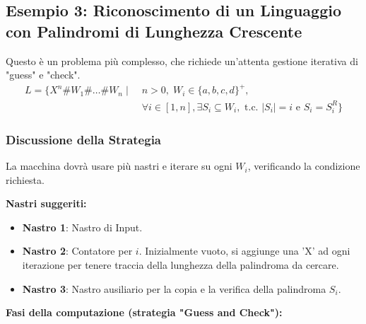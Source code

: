 \documentclass[a4paper]{article}
\theoremstyle{definition} %
\begin{document}
\newpage
\subsection{Esempio 3: Riconoscimento di un Linguaggio con Palindromi di Lunghezza Crescente}

Questo è un problema più complesso, che richiede un'attenta gestione iterativa di "guess" e "check".
\begin{align}
L = \{X^n \# W_1 \# \dots \# W_n \mid &\; n>0, \; W_i \in \{a,b,c,d\}^+, \\
&\; \forall i \in [1,n], \exists S_i \subseteq W_i, \text{ t.c. } |S_i|=i \text{ e } S_i = S_i^R \} \nonumber
\end{align}

\subsubsection{Discussione della Strategia}
La macchina dovrà usare più nastri e iterare su ogni $W_i$, verificando la condizione richiesta.

\textbf{Nastri suggeriti:}
\begin{itemize}
    \item \textbf{Nastro 1}: Nastro di Input.
    \item \textbf{Nastro 2}: Contatore per $i$. Inizialmente vuoto, si aggiunge una 'X' ad ogni iterazione per tenere traccia della lunghezza della palindroma da cercare.
    \item \textbf{Nastro 3}: Nastro ausiliario per la copia e la verifica della palindroma $S_i$.
\end{itemize}

\textbf{Fasi della computazione (strategia "Guess and Check"):}
\end{document}
